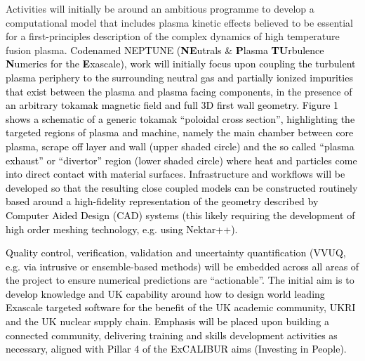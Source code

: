 \documentclass[a4paper]{article}
\begin{document}
Activities will initially be around an ambitious programme to develop a computational model that includes plasma kinetic
effects believed to be essential for a first-principles description of the complex dynamics of high temperature fusion
plasma\textcolor[rgb]{0.0,0.5019608,0.0}{. }\textcolor{black}{Codenamed NEPTUNE
(}\textbf{\textcolor{black}{NE}}\textcolor{black}{utrals \& }\textbf{\textcolor{black}{P}}\textcolor{black}{lasma
}\textbf{\textcolor{black}{TU}}\textcolor{black}{rbulence }\textbf{\textcolor{black}{N}}\textcolor{black}{umerics for
the }\textbf{\textcolor{black}{E}}\textcolor{black}{xascale), work will initially focus upon coupling the turbulent
plasma periphery to the surrounding neutral gas and partially ionized impurities that exist between the plasma and
plasma facing components, in the presence of an arbitrary tokamak magnetic field and full 3D first wall geometry.
Figure 1 shows a schematic of a generic tokamak ``poloidal cross section'', highlighting the targeted regions of plasma
and machine, namely the main chamber between core plasma, scrape off layer and wall (upper shaded circle) and the so
called ``plasma exhaust'' or }\textcolor{black}{{}``divertor'' region (lower shaded circle) where heat and particles
come into direct contact with material surfaces. Infrastructure and workflows will be developed so that the resulting
close coupled models can be constructed routinely based around a high-fidelity representation of the geometry described
by Computer Aided Design (CAD) systems (this likely requiring the development of high order meshing technology, e.g.
using Nektar++).}


\bigskip

\textcolor{black}{Quality control, verification, validation and uncertainty quantification (VVUQ, e.g. via intrusive or
ensemble-based methods) will be embedded across all areas of the project to ensure numerical predictions are
``actionable''. The initial aim is to develop knowledge and UK capability around how to design world leading Exascale
targeted software for the benefit of the UK academic community, UKRI and the UK nuclear supply chain. Emphasis will be
placed upon building a connected community, delivering training and skills development activities as necessary, aligned
with Pillar 4 of the ExCALIBUR aims (Investing in People).}


\bigskip
\end{document}
